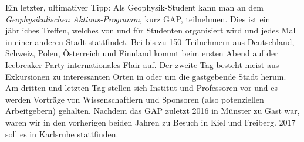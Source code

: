 \begin{multicols}{2}
Ein letzter, ultimativer Tipp: Als Geophysik-Student kann man an dem \emph{Geophysikalischen Aktions-Programm}, kurz GAP, teilnehmen.
Dies ist ein jährliches Treffen, welches von und für Studenten organisiert wird und jedes Mal in einer anderen Stadt stattfindet.
Bei bis zu 150~Teilnehmern aus Deutschland, Schweiz, Polen, Österreich und Finnland kommt beim ersten Abend auf der Icebreaker-Party internationales Flair auf.
Der zweite Tag besteht meist aus Exkursionen zu interessanten Orten in oder um die gastgebende Stadt herum.
Am dritten und letzten Tag stellen sich Institut und Professoren vor und es werden Vorträge von Wissenschaftlern und Sponsoren (also potenziellen Arbeitgebern) gehalten.
Nachdem das GAP zuletzt 2016 in Münster zu Gast war, waren wir in den vorherigen beiden Jahren zu Besuch in Kiel und Freiberg.
2017 soll es in Karlsruhe stattfinden.

\end{multicols}

